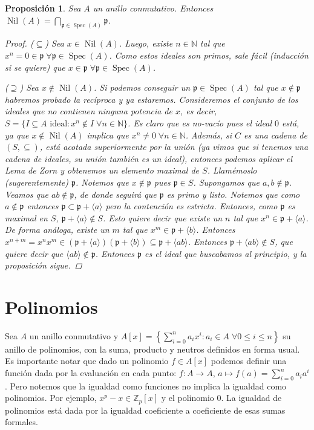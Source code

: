 \documentclass[12pt]{book}
\newtheorem{prop}[teo]{Proposición}
\theoremstyle{definition}
\newcommand{\ZZ}{\mathbb{Z}}      %
\newcommand{\NN}{\mathbb{N}}
\DeclareMathOperator{\Nil}{Nil}
\DeclareMathOperator{\spec}{Spec}
\begin{document}
\begin{prop}
Sea $A$ un anillo conmutativo. Entonces $\Nil (A) = \displaystyle\bigcap_{\mathfrak{p}\in\spec(A)} \mathfrak{p}$.
\begin{proof}
($\subseteq$) Sea $x\in\Nil(A)$. Luego, existe $n\in\NN$ tal que $x^n=0\in\mathfrak{p} \; \forall \mathfrak{p}\in\spec(A)$. Como estos ideales son primos, sale fácil (inducción si se quiere) que $x\in\mathfrak{p}\;\forall\mathfrak{p}\in\spec(A)$.

($\supseteq$) Sea $x\notin \Nil (A)$. Si podemos conseguir un $\mathfrak{p}\in\spec(A)$ tal que $x\notin\mathfrak{p}$ habremos probado la recíproca y ya estaremos. Consideremos el conjunto de los ideales que no contienen ninguna potencia de $x$, es decir, $S=\{I\subseteq A \text{ ideal}:x^n\notin I \;\forall n\in\NN\}$. Es claro que es no-vacío pues el ideal $0$ está, ya que $x\notin\Nil(A)$ implica que $x^n\neq 0 \;\forall n\in\NN$. Además, si $C$ es una cadena de $(S,\subseteq)$, está acotada superiormente por la unión (ya vimos que si tenemos una cadena de ideales, su unión también es un ideal), entonces podemos aplicar el Lema de Zorn y obtenemos un elemento maximal de $S$. Llamémoslo (sugerentemente) $\mathfrak{p}$. Notemos que $x\notin\mathfrak{p}$ pues $\mathfrak{p}\in S$. Supongamos que $a,b\notin\mathfrak{p}$. Veamos que $ab\notin \mathfrak{p}$, de donde seguirá que $\mathfrak{p}$ es primo y listo. Notemos que como $a\notin\mathfrak{p}$ entonces $\mathfrak{p}\subset \mathfrak{p}+\langle a\rangle$ pero la contención es estricta. Entonces, como $\mathfrak{p}$ es maximal en $S$, $\mathfrak{p}+\langle a\rangle \notin S$. Esto quiere decir que existe un $n$ tal que $x^n \in \mathfrak{p}+\langle a\rangle$. De forma análoga, existe un $m$ tal que $x^m \in \mathfrak{p}+\langle b\rangle$. Entonces $x^{n+m} = x^n x^m \in (\mathfrak{p}+\langle a\rangle)(\mathfrak{p}+\langle b\rangle)\subseteq \mathfrak{p}+\langle ab\rangle$. Entonces $\mathfrak{p}+\langle ab\rangle\notin S$, que quiere decir que $\langle ab\rangle \notin\mathfrak{p}$. Entonces $\mathfrak{p}$ es el ideal que buscabamos al principio, y la proposición sigue.
\end{proof}
\end{prop}

\section{Polinomios}

Sea $A$ un anillo conmutativo y $A[x]=\left\{\displaystyle\sum_{i=0}^{n} a_i x^i : a_i\in A \; \forall 0\leq i\leq n\right\}$ su anillo de polinomios, con la suma, producto y neutros definidos en forma usual. Es importante notar que dado un polinomio $f\in A[x]$ podemos definir una función dada por la evaluación en cada punto: $f:A\to A$, $a\mapsto f(a)=\displaystyle\sum_{i=0}^n a_i a^i$. Pero notemos que la igualdad como funciones no implica la igualdad como polinomios. Por ejemplo, $x^p - x \in \ZZ_p[x]$ y el polinomio $0$. La igualdad de polinomios está dada por la igualdad coeficiente a coeficiente de esas sumas formales.
\end{document}
